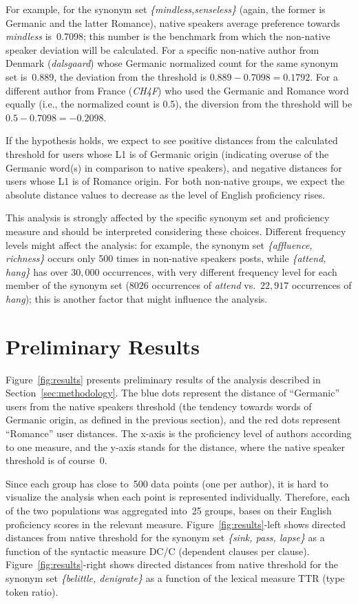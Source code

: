 \documentclass[11pt]{article}
\newcommand{\textnl}{\textsl}
\begin{document}
For example, for the synonym set \textnl{\{mindless,senseless\}} (again, the former is Germanic and the latter Romance), native speakers average preference towards \textnl{mindless} is~0.7098; this number is the benchmark from which the non-native speaker deviation will be calculated. For a specific non-native author from Denmark (\textit{dalsgaard}) whose Germanic normalized count for the same synonym set is~0.889, the deviation from the threshold is $0.889-0.7098 = 0.1792$. For a different author from France (\textit{CH4F}) who used the Germanic and Romance word equally (i.e., the normalized count is 0.5), the diversion from the threshold will be $0.5 - 0.7098  = -0.2098$. 

If the hypothesis holds, we expect to see positive distances from the calculated threshold for users whose L1 is of Germanic origin (indicating overuse of the Germanic word(s) in comparison to native speakers), and negative distances for users whose L1 is of Romance origin. For both non-native groups, we expect the absolute distance values to decrease as the level of English proficiency rises. 

This analysis is strongly affected by the specific synonym set and proficiency measure and should be interpreted considering these choices. Different frequency levels might affect the analysis: for example, the synonym set \textnl{\{affluence, richness\}} occurs only 500 times in non-native speakers posts, while \textnl{\{attend, hang\}} has over $30,000$ occurrences, with very different frequency level for each member of the synonym set ($8026$ occurrences of \textnl{attend} vs.\ $22,917$ occurrences of \textnl{hang}); this is  another factor that might influence the analysis. 


\section{Preliminary Results}
Figure~\ref{fig:results} presents preliminary results of the analysis described in Section~\ref{sec:methodology}.
The blue dots represent the distance of ``Germanic'' users from the native speakers threshold (the tendency towards words of Germanic origin, as defined in the previous section), and the red dots represent ``Romance'' user distances. 
The x-axis is the proficiency level of authors according to one measure, and the y-axis stands for the distance, where the native speaker threshold is of course~0.
 
Since each group has close to~500 data points (one per author), it is hard to visualize the analysis when each point is represented individually. Therefore, each of the two populations was aggregated into~25 groups, bases on their English proficiency scores in the relevant measure.
Figure~\ref{fig:results}-left shows directed distances from native threshold for the synonym set  \textnl{\{sink, pass, lapse\}} as a function of the syntactic measure DC/C (dependent clauses per clause).
Figure~\ref{fig:results}-right shows directed distances from native threshold for the synonym set  \textnl{\{belittle, denigrate\}} as a function of the lexical measure TTR (type token ratio).
\end{document}
